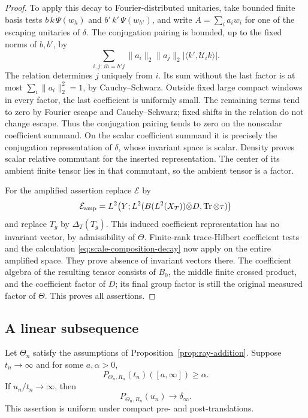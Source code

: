 \begin{proof}
To apply this decay to Fourier-distributed unitaries, take
bounded finite basis tests \(b\,k\,\Psi(w_h)\) and
\(b'\,k'\,\Psi(w_{h'})\), and write
\(A=\sum_i a_iw_i\) for one of the escaping unitaries of
\(\delta\).  The conjugation pairing is bounded, up to
the fixed norms of \(b,b'\), by
\begin{equation}\label{eq:scale-composition-decay}
 \sum_{i,j:\,ih=h'j}
 \|a_i\|_2\|a_j\|_2
       |\langle k',\mathcal U_i k\rangle|.
\end{equation}
The relation determines \(j\) uniquely from \(i\).
Its sum without the last factor is at most
\(\sum_i\|a_i\|_2^2=1\), by Cauchy--Schwarz.
Outside fixed large compact windows in every factor,
the last coefficient is uniformly small.  The remaining
terms tend to zero by Fourier escape and Cauchy--Schwarz;
fixed shifts in the relation do not change escape.
Thus the conjugation pairing tends to zero on
the nonscalar coefficient summand.  On the scalar
coefficient summand it is precisely the conjugation
representation of \(\delta\), whose invariant space is
scalar.  Density proves scalar relative commutant for
the inserted representation.  The center of its ambient
finite tensor lies in that commutant, so the ambient
tensor is a factor.

For the amplified assertion replace \(\mathcal E\) by
\[
 \mathcal E_{\rm amp}=
 L^2\bigl(Y;
   L^2(B(L^2(X_T))\bar\otimes D,\operatorname{Tr}\otimes\tau)\bigr)
\]
and replace \(T_g\) by \(\Delta_T(T_g)\).
This induced coefficient representation has no invariant
vector, by admissibility of \(\Theta\).  Finite-rank
trace-Hilbert coefficient tests and the calculation
\eqref{eq:scale-composition-decay} now apply on the
entire amplified space.  They prove absence of invariant
vectors there.  The coefficient algebra of the resulting
tensor consists of \(B_0\), the middle finite crossed
product, and the coefficient factor of \(D\); its final
group factor is still the original measured factor of
\(\Theta\).  This proves all assertions.
\end{proof}

\subsection{A linear subsequence}

\begin{lemma}\label{lem:scale-many-increments}
Let \(\Theta_n\) satisfy the assumptions of
Proposition~\ref{prop:ray-addition}.  Suppose \(t_n\to\infty\)
and for some \(a,\alpha>0\),
\[
 P_{\Theta_n,R_n}(t_n)([a,\infty])\ge\alpha.
\]
If \(u_n/t_n\to\infty\), then
\begin{equation}
 P_{\Theta_n,R_n}(u_n)\longrightarrow\delta_\infty .
 \label{eq:scale-many-increments}
\end{equation}
This assertion is uniform under compact pre- and
post-translations.
\end{lemma}

